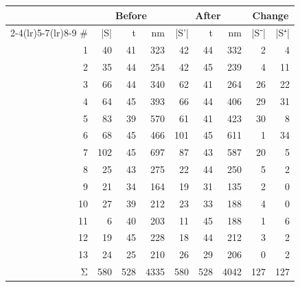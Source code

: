 \begin{tabular}{rrrrrrrrr}
\toprule
\multicolumn{1}{c}{} & \multicolumn{3}{c}{Before} & \multicolumn{3}{c}{After} & \multicolumn{2}{c}{Change} \\
\cmidrule(lr){2-4}\cmidrule(lr){5-7}\cmidrule(lr){8-9}
# & |S| & t & nm & |S'| & t & nm & |S⁻| & |S⁺|
\\
\midrule
\rowcolor{seg1!30} 1 & 40 & 41 & 323 & 42 & 44 & 332 & 2 & 4 \\
\rowcolor{seg2!30} 2 & 35 & 44 & 254 & 42 & 45 & 239 & 4 & 11 \\
\rowcolor{seg3!30} 3 & 66 & 44 & 340 & 62 & 41 & 264 & 26 & 22 \\
\rowcolor{seg4!30} 4 & 64 & 45 & 393 & 66 & 44 & 406 & 29 & 31 \\
\rowcolor{seg5!30} 5 & 83 & 39 & 570 & 61 & 41 & 423 & 30 & 8 \\
\rowcolor{seg6!30} 6 & 68 & 45 & 466 & 101 & 45 & 611 & 1 & 34 \\
\rowcolor{seg7!30} 7 & 102 & 45 & 697 & 87 & 43 & 587 & 20 & 5 \\
\rowcolor{seg8!30} 8 & 25 & 43 & 275 & 22 & 44 & 250 & 5 & 2 \\
\rowcolor{seg9!30} 9 & 21 & 34 & 164 & 19 & 31 & 135 & 2 & 0 \\
\rowcolor{seg10!30} 10 & 27 & 39 & 212 & 23 & 33 & 188 & 4 & 0 \\
\rowcolor{seg11!30} 11 & 6 & 40 & 203 & 11 & 45 & 188 & 1 & 6 \\
\rowcolor{seg12!30} 12 & 19 & 45 & 228 & 18 & 44 & 212 & 3 & 2 \\
\rowcolor{seg13!30} 13 & 24 & 25 & 210 & 26 & 29 & 206 & 0 & 2 \\
\rowcolor{gray!15} Σ & 580 & 528 & 4335 & 580 & 528 & 4042 & 127 & 127 \\
\bottomrule
\end{tabular}
